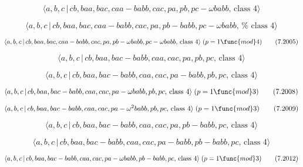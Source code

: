 \documentclass[10pt]{article}
\begin{document}
\begin{equation}
\langle a,b,c\,|\,cb,baa,bac,caa-babb,cac,pa,pb,pc-\omega babb,\,\text{class 
}4\rangle  \tag{7.2003}
\end{equation}

\begin{equation}
\langle a,b,c\,|\,cb,baa,bac,caa-babb,cac,pa,pb-babb,pc-\omega babb,\,\text{%
class }4\rangle  \tag{7.2004}
\end{equation}

\begin{equation}
\langle a,b,c\,|\,cb,baa,bac,caa-babb,cac,pa,pb-\omega babb,pc-\omega babb,\,%
\text{class }4\rangle \;(p=1\func{mod}4)  \tag{7.2005}
\end{equation}

\begin{equation}
\langle a,b,c\,|\,cb,baa,bac-babb,caa,cac,pa,pb,pc,\,\text{class }4\rangle 
\tag{7.2006}
\end{equation}

\begin{equation}
\langle a,b,c\,|\,cb,baa,bac-babb,caa,cac,pa-babb,pb,pc,\,\text{class }%
4\rangle  \tag{7.2007}
\end{equation}

\begin{equation}
\langle a,b,c\,|\,cb,baa,bac-babb,caa,cac,pa-\omega babb,pb,pc,\,\text{class 
}4\rangle \;(p=1\func{mod}3)  \tag{7.2008}
\end{equation}

\begin{equation}
\langle a,b,c\,|\,cb,baa,bac-babb,caa,cac,pa-\omega ^{2}babb,pb,pc,\,\text{%
class }4\rangle \;(p=1\func{mod}3)  \tag{7.2009}
\end{equation}

\begin{equation}
\langle a,b,c\,|\,cb,baa,bac-babb,caa,cac,pa,pb-babb,pc,\,\text{class }%
4\rangle  \tag{7.2010}
\end{equation}

\begin{equation}
\langle a,b,c\,|\,cb,baa,bac-babb,caa,cac,pa-babb,pb-babb,pc,\,\text{class }%
4\rangle  \tag{7.2011}
\end{equation}

\begin{equation}
\langle a,b,c\,|\,cb,baa,bac-babb,caa,cac,pa-\omega babb,pb-babb,pc,\,\text{%
class }4\rangle \;(p=1\func{mod}3)  \tag{7.2012}
\end{equation}
\end{document}
